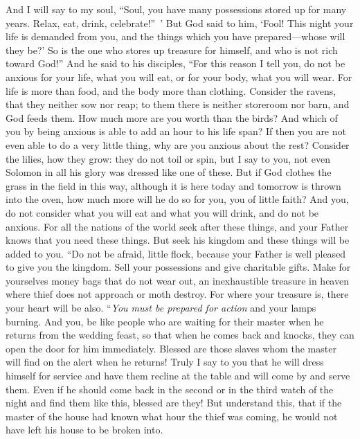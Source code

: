 \begin{biblechapter}
\verse And I will say to my soul, “Soul, you have many possessions stored up for many years. Relax, eat, drink, celebrate!” ’
\verse But God said to him, ‘Fool! This night your life is demanded from you, and the things which you have prepared—whose will they be?’
\verse So is the one who stores up treasure for himself, and who is not rich toward God!”
 And he said to his disciples, “For this reason I tell you, do not be anxious for your life, what you will eat, or for your body, what you will wear.
\verse For life is more than food, and the body more than clothing.
\verse Consider the ravens, that they neither sow nor reap; to them there is neither storeroom nor barn, and God feeds them. How much more are you worth than the birds?
\verse And which of you by being anxious is able to add an hour to his life span?
\verse If then you are not even able to do a very little thing, why are you anxious about the rest?
\verse Consider the lilies, how they grow: they do not toil or spin, but I say to you, not even Solomon in all his glory was dressed like one of these.
\verse But if God clothes the grass in the field in this way, although it is here today and tomorrow is thrown into the oven, how much more will he do so for you, you of little faith?
\verse And you, do not consider what you will eat and what you will drink, and do not be anxious.
\verse For all the nations of the world seek after these things, and your Father knows that you need these things.
\verse But seek his kingdom and these things will be added to you.
\verse “Do not be afraid, little flock, because your Father is well pleased to give you the kingdom.
\verse Sell your possessions and give charitable gifts. Make for yourselves money bags that do not wear out, an inexhaustible treasure in heaven where thief does not approach or moth destroy.
\verse For where your treasure is, there your heart will be also.
 “\textit{You must be prepared for action} and your lamps burning.
\verse And you, be like people who are waiting for their master when he returns from the wedding feast, so that when he comes back and knocks, they can open the door for him immediately.
\verse Blessed are those slaves whom the master will find on the alert when he returns! Truly I say to you that he will dress himself for service and have them recline at the table and will come by and serve them.
\verse Even if he should come back in the second or in the third watch of the night and find them like this, blessed are they!
\verse But understand this, that if the master of the house had known what hour the thief was coming, he would not have left his house to be broken into.

\end{biblechapter}
